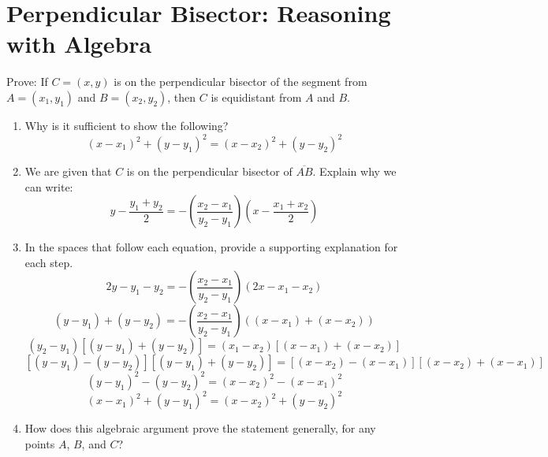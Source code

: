 \newpage 

\section{Perpendicular Bisector: Reasoning with Algebra}
Prove:  If $C=(x,y)$ is on the perpendicular bisector of the segment from $A=(x_1,y_1)$ and $B=(x_2,y_2)$, then $C$ is equidistant from $A$ and $B$.  

\begin{enumerate}
\item Why is it sufficient to show the following?  
$$(x-x_1)^2+(y-y_1)^2= (x-x_2)^2+(y-y_2)^2$$
\vspace{0.35in}

\item We are given that $C$ is on the perpendicular bisector of $\overline{AB }$.  Explain why we can write:  
$$y-\frac{y_1+y_2}{2} = -\left(\frac{x_2-x_1}{y_2-y_1}\right)\left(x-\frac{x_1+x_2}{2}\right)$$
\vspace{0.5in}
\item In the spaces that follow each equation, provide a supporting explanation for each step.  
\vspace{0.35in}
$$2y-y_1-y_2 = -\left(\frac{x_2-x_1}{y_2-y_1}\right)\left(2x-x_1-x_2\right)$$
\vspace{0.35in}
$$(y-y_1)+(y-y_2) = -\left(\frac{x_2-x_1}{y_2-y_1}\right)\left((x-x_1)+(x-x_2)\right)$$
\vspace{0.35in}
$$(y_2-y_1)\left[(y-y_1)+(y-y_2)\right]= (x_1-x_2)\left[(x-x_1)+(x-x_2)\right]$$
\vspace{0.35in}
$$\left[(y-y_1)-(y-y_2)\right]\left[(y-y_1)+(y-y_2)\right]= \left[(x-x_2)-(x-x_1)\right]\left[(x-x_2)+(x-x_1)\right]$$
\vspace{0.35in}
$$(y-y_1)^2-(y-y_2)^2= (x-x_2)^2-(x-x_1)^2$$
\vspace{0.35in}
$$(x-x_1)^2+(y-y_1)^2= (x-x_2)^2+(y-y_2)^2$$
\vspace{0.35in}
\item How does this algebraic argument prove the statement generally, for any points $A$, $B$, and $C$?  
\end{enumerate}
